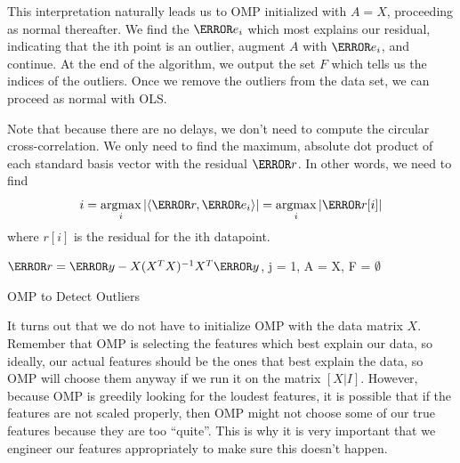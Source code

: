  This interpretation naturally leads us to OMP initialized with $A = X$, proceeding as normal thereafter.
  We find the $\V{e_i}$ which most explains our residual, indicating that the ith point is an outlier, augment $A$ with $\V{e_i}$, and continue.
  At the end of the algorithm, we output the set $F$ which tells us the indices of the outliers.
  Once we remove the outliers from the data set, we can proceed as normal with OLS.

  Note that because there are no delays, we don't need to compute the circular cross-correlation. 
  We only need to find the maximum, absolute dot product of each standard basis vector with the residual $\V{r}$. In other words, we need to find
  \[
	i = \argmax_{i} |\langle \V{r}, \V{e_i} \rangle| = \argmax_{i}|\V{r}[i]|
  \]
  where $r[i]$ is the residual for the ith datapoint.
  \begin{algorithm}[!h]	
	\SetAlgoLined
	$\V{r} = \V{y} - X(X^TX)^{-1}X^T\V{y}$, j = 1, A = X, F = $\emptyset$\;
	\caption{OMP to Detect Outliers}
	\label{code:omp}
  \end{algorithm}

  It turns out that we do not have to initialize OMP with the data matrix $X$. Remember that OMP is selecting the features which best explain our data, so ideally, our actual features should be the ones that best explain the data, so OMP will choose them anyway if we run it on the matrix $[X | I]$.
  However, because OMP is greedily looking for the loudest features, it is possible that if the features are not scaled properly, then OMP might not choose some of our true features because they are too ``quite''.
  This is why it is very important that we engineer our features appropriately to make sure this doesn't happen.
